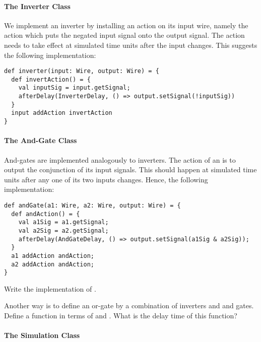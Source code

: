 {\paragraph{The Inverter Class}
We implement an inverter by installing an action on its input wire,
namely the action which puts the negated input signal onto the output
signal.  The action needs to take effect at 
simulated time units after the input changes. This suggests the 
following implementation:
\begin{lstlisting}
def inverter(input: Wire, output: Wire) = {
  def invertAction() = {
    val inputSig = input.getSignal;
    afterDelay(InverterDelay, () => output.setSignal(!inputSig))
  }
  input addAction invertAction
}
\end{lstlisting}

\paragraph{The And-Gate Class}
And-gates are implemented analogously to inverters.  The action of an
 is to output the conjunction of its input signals.
This should happen at  simulated time units after
any one of its two inputs changes. Hence, the following implementation:
\begin{lstlisting}
def andGate(a1: Wire, a2: Wire, output: Wire) = {
  def andAction() = {
    val a1Sig = a1.getSignal;
    val a2Sig = a2.getSignal;
    afterDelay(AndGateDelay, () => output.setSignal(a1Sig & a2Sig));
  }
  a1 addAction andAction;
  a2 addAction andAction;
}
\end{lstlisting}

\begin{exercise} Write the implementation of .
\end{exercise}

\begin{exercise} Another way is to define an or-gate by a combination of
inverters and and gates. Define a function  in terms of
 and . What is the delay time of this function?
\end{exercise}

\paragraph{The Simulation Class}

}
